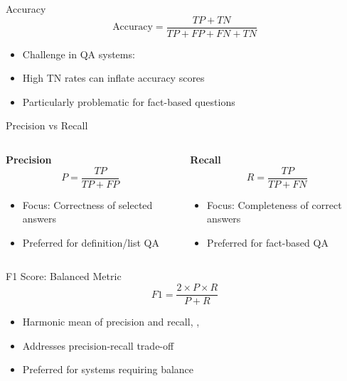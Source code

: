 \begin{frame}{Accuracy}
\[
\text{Accuracy} = \frac{TP + TN}{TP + FP + FN + TN}
\]

\begin{itemize}
    \item Challenge in QA systems:
    \item High TN rates can inflate accuracy scores
    \item Particularly problematic for fact-based questions
\end{itemize}
\end{frame}

\begin{frame}{Precision vs Recall}
\begin{columns}
\begin{column}{0.5\textwidth}
\textbf{Precision}
\[
P = \frac{TP}{TP + FP}
\]
\begin{itemize}
    \item Focus: Correctness of selected answers
    \item Preferred for definition/list QA
\end{itemize}
\end{column}

\begin{column}{0.5\textwidth}
\textbf{Recall}
\[
R = \frac{TP}{TP + FN}
\]
\begin{itemize}
    \item Focus: Completeness of correct answers
    \item Preferred for fact-based QA
\end{itemize}
\end{column}
\end{columns}
\end{frame}

\begin{frame}{F1 Score: Balanced Metric}
\[
F1 = \frac{2 \times P \times R}{P + R}
\]

\begin{itemize}
    \item Harmonic mean of precision and recall\cite{kumar2019}, \cite{yao2014information}, \cite{zhou2013improving}
    \item Addresses precision-recall trade-off
    \item Preferred for systems requiring balance
\end{itemize}

\end{frame}

